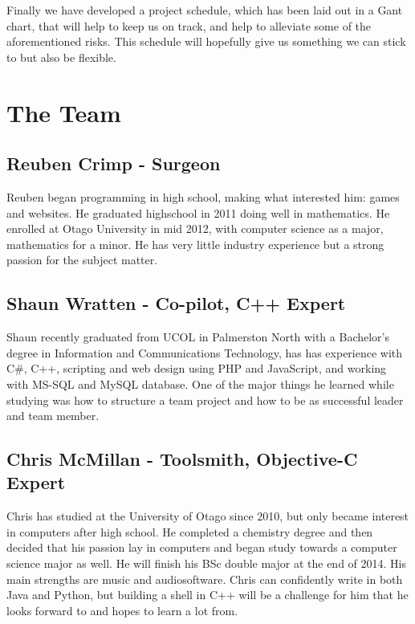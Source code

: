 \documentclass[a4paper,12pt]{article}
\begin{document}
Finally we have developed a project schedule, which has been laid out in a Gant chart, that will help to keep us on track, and help to alleviate some of the aforementioned risks. This schedule will hopefully give us something we can stick to but also be flexible. 

\pagebreak
\section*{The Team}

\subsection*{Reuben Crimp - \small Surgeon}
Reuben began programming in high school, making what interested him: games and websites. He graduated highschool in 2011 doing well in mathematics. He enrolled at Otago University in mid 2012, with computer science as a major, mathematics for a minor. He has very little industry experience but a strong passion for the subject matter.

\subsection*{Shaun Wratten - \small Co-pilot, C++ Expert}
Shaun recently graduated from UCOL in Palmerston North with a Bachelor’s degree in Information and Communications Technology,
has has experience with
C\#, C++, scripting and web design using PHP and JavaScript, and working with MS-SQL and MySQL database. One of the major things he learned while studying was how to
structure a team project and how to be as successful leader and team member.

\subsection*{Chris McMillan - \small Toolsmith, Objective-C Expert}
Chris has studied at the University of Otago since 2010, but only became interest in computers after high school. He completed a chemistry degree and then decided that his passion lay in computers and began study towards a computer science major as well. He will finish his BSc double major at the end of 2014. His main strengths are music and audiosoftware. Chris can confidently write in both Java and Python, but building a shell in C++ will be a challenge for him that he looks forward to and hopes to learn a lot from.
\end{document}
